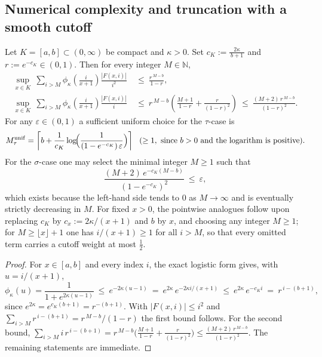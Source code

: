 \FloatBarrier

\subsection{Numerical complexity and truncation with a smooth cutoff}

\begin{theorem}\label{thm:truncation}
Let $K=[a,b]\subset(0,\infty)$ be compact and $\kappa>0$. Set $c_K:=\frac{2\kappa}{\,b+1\,}$ and $r:=e^{-c_K}\in(0,1)$. Then for every integer $M\in\mathbb{N}$,
\begin{align*}
\sup_{x\in K}\ \sum_{i>M}\phi_\kappa\!\left(\frac{i}{x+1}\right)\frac{|F(x,i)|}{i^2}
&\ \le\ \frac{r^{\,M-b}}{1-r},\\[4pt]
\sup_{x\in K}\ \sum_{i>M}\phi_\kappa\!\left(\frac{i}{x+1}\right)\frac{|F(x,i)|}{i}
&\ \le\ r^{\,M-b}\!\left(\frac{M+1}{1-r}+\frac{r}{(1-r)^2}\right)
\ \le\ \frac{(M+2)\,r^{\,M-b}}{(1-r)^2}.
\end{align*}
For any $\varepsilon\in(0,1)$ a sufficient uniform choice for the $\tau$-case is
\[
M_\tau^{\mathrm{unif}}=\left\lceil b+\frac{1}{c_K}\log\!\Bigl(\frac{1}{(1-e^{-c_K})\,\varepsilon}\Bigr)\right\rceil\ \ (\ge1,\text{ since }b>0\text{ and the logarithm is positive}).
\]
For the $\sigma$-case one may select the minimal integer $M\ge1$ such that
\[
\frac{(M+2)\,e^{-c_K(M-b)}}{(1-e^{-c_K})^2}\ \le\ \varepsilon,
\]
which exists because the left-hand side tends to $0$ as $M\to\infty$ and is eventually strictly decreasing in $M$. For fixed $x>0$, the pointwise analogues follow upon replacing $c_K$ by $c_x:=2\kappa/(x+1)$ and $b$ by $x$, and choosing any integer $M\ge1$; for $M\ge\lfloor x\rfloor+1$ one has $i/(x+1)\ge 1$ for all $i>M$, so that every omitted term carries a cutoff weight at most $\tfrac12$.
\begin{proof}
For $x\in[a,b]$ and every index $i$, the exact logistic form gives, with $u=i/(x+1)$,
\[
\phi_\kappa(u)=\frac{1}{1+e^{2\kappa(u-1)}}\ \le\ e^{-2\kappa(u-1)}
\ =\ e^{2\kappa}\,e^{-2\kappa i/(x+1)}\ \le\ e^{2\kappa}\,e^{-c_K i}\ =\ r^{\,i-(b+1)},
\]
since $e^{2\kappa}=e^{c_K(b+1)}=r^{-(b+1)}$. With $|F(x,i)|\le i^2$ and $\sum_{i>M}r^{\,i-(b+1)}=r^{\,M-b}/(1-r)$ the first bound follows. For the second bound, $\sum_{i>M} i\,r^{\,i-(b+1)}=r^{\,M-b}\bigl(\frac{M+1}{1-r}+\frac{r}{(1-r)^2}\bigr)\le \frac{(M+2)\,r^{\,M-b}}{(1-r)^2}$. The remaining statements are immediate.
\end{proof}
\end{theorem}

